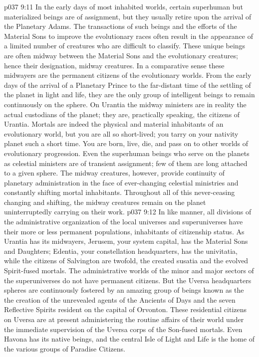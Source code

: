\vs p037 9:11 \pc {} In the early days of most inhabited worlds, certain superhuman but materialized beings are of assignment, but they usually retire upon the arrival of the Planetary Adams. The transactions of such beings and the efforts of the Material Sons to improve the evolutionary races often result in the appearance of a limited number of creatures who are difficult to classify. These unique beings are often midway between the Material Sons and the evolutionary creatures; hence their designation, midway creatures. In a comparative sense these midwayers are the permanent citizens of the evolutionary worlds. From the early days of the arrival of a Planetary Prince to the far\hyp{}distant time of the settling of the planet in light and life, they are the only group of intelligent beings to remain continuously on the sphere. On Urantia the midway ministers are in reality the actual custodians of the planet; they are, practically speaking, the citizens of Urantia. Mortals are indeed the physical and material inhabitants of an evolutionary world, but you are all so short\hyp{}lived; you tarry on your nativity planet such a short time. You are born, live, die, and pass on to other worlds of evolutionary progression. Even the superhuman beings who serve on the planets as celestial ministers are of transient assignment; few of them are long attached to a given sphere. The midway creatures, however, provide continuity of planetary administration in the face of ever\hyp{}changing celestial ministries and constantly shifting mortal inhabitants. Throughout all of this never\hyp{}ceasing changing and shifting, the midway creatures remain on the planet uninterruptedly carrying on their work.
\vs p037 9:12 \pc In like manner, all divisions of the administrative organization of the local universes and superuniverses have their more or less permanent populations, inhabitants of citizenship status. As Urantia has its midwayers, Jerusem, your system capital, has the Material Sons and Daughters; Edentia, your constellation headquarters, has the univitatia, while the citizens of Salvington are twofold, the created susatia and the evolved Spirit\hyp{}fused mortals. The administrative worlds of the minor and major sectors of the superuniverses do not have permanent citizens. But the Uversa headquarters spheres are continuously fostered by an amazing group of beings known as the  the creation of the unrevealed agents of the Ancients of Days and the seven Reflective Spirits resident on the capital of Orvonton. These residential citizens on Uversa are at present administering the routine affairs of their world under the immediate supervision of the Uversa corps of the Son\hyp{}fused mortals. Even Havona has its native beings, and the central Isle of Light and Life is the home of the various groups of Paradise Citizens.

